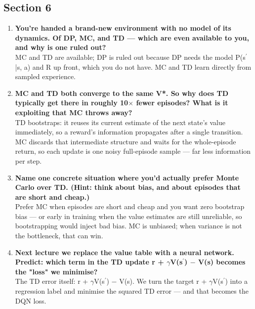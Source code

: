 \documentclass[11pt]{article}
\begin{document}
\subsection*{Section 6}
\begin{enumerate}[leftmargin=1.5em,itemsep=5pt]
\item \textbf{You're handed a brand-new environment with no model of its dynamics. Of DP, MC, and TD --- which are even available to you, and why is one ruled out?}\\[2pt]
\textcolor{ink2}{MC and TD are available; DP is ruled out because DP needs the model P(s\ensuremath{{}^{\prime}}|s, a) and R up front, which you do not have. MC and TD learn directly from sampled experience.}
\item \textbf{MC and TD both converge to the same V*. So why does TD typically get there in roughly 10\ensuremath{\times} fewer episodes? What is it exploiting that MC throws away?}\\[2pt]
\textcolor{ink2}{TD bootstraps: it reuses its current estimate of the next state's value immediately, so a reward's information propagates after a single transition. MC discards that intermediate structure and waits for the whole-episode return, so each update is one noisy full-episode sample --- far less information per step.}
\item \textbf{Name one concrete situation where you'd actually prefer Monte Carlo over TD. (Hint: think about bias, and about episodes that are short and cheap.)}\\[2pt]
\textcolor{ink2}{Prefer MC when episodes are short and cheap and you want zero bootstrap bias --- or early in training when the value estimates are still unreliable, so bootstrapping would inject bad bias. MC is unbiased; when variance is not the bottleneck, that can win.}
\item \textbf{Next lecture we replace the value table with a neural network. Predict: which term in the TD update r + \ensuremath{\gamma}V(s\ensuremath{{}^{\prime}}) \ensuremath{-} V(s) becomes the "loss" we minimise?}\\[2pt]
\textcolor{ink2}{The TD error itself: r + \ensuremath{\gamma}V(s\ensuremath{{}^{\prime}}) \ensuremath{-} V(s). We turn the target r + \ensuremath{\gamma}V(s\ensuremath{{}^{\prime}}) into a regression label and minimise the squared TD error --- and that becomes the DQN loss.}
\end{enumerate}
\end{document}
